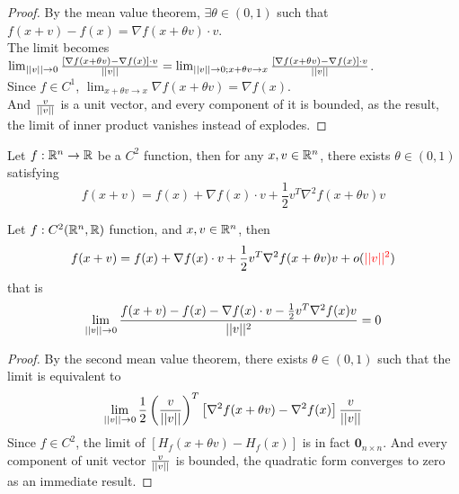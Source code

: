 \documentclass{article}
\begin{document}
    \begin{proof}
    	By the mean value theorem, $\exists \theta \in (0, 1)$ such that $f(x+v) - f(x) = \nabla f(x + \theta v) \cdot v$.\\
    	The limit becomes $\lim_{\vert \vert {v} \vert \vert \to 0} \frac{[\nabla f(x + \theta v) - \nabla f(x)] \cdot v}{\vert \vert {v} \vert \vert} = \lim_{\vert \vert {v} \vert \vert \to 0; x + \theta v \to x} \frac{[\nabla f(x + \theta v) - \nabla f(x)] \cdot v}{\vert \vert {v} \vert \vert}$.\\
    	Since $f \in C^1$, $\lim_{x + \theta v \to x} \nabla f(x + \theta v) = \nabla f(x)$.\\
    	And $\frac{v}{\vert \vert {v} \vert \vert}$ is a unit vector, and every component of it is bounded, as the result, the limit of inner product vanishes instead of explodes.
    \end{proof}
    
    \begin{theorem}
        Let $f: \mathbb{R}^n \to \mathbb{R}$ be a $C^2$ function, then for any $x, v \in \mathbb{R}^n$, there exists $\theta \in (0, 1)$ satisfying
        \begin{equation}
            f(x + v) = f(x) + \nabla f(x) \cdot v + \frac{1}{2} v^T \nabla^2 f(x + \theta v) v
        \end{equation}
    \end{theorem}
    
    \begin{proposition}
        Let $f: C^2(\mathbb{R}^n, \mathbb{R})$ function, and $x, v \in \mathbb{R}^n$, then
        \begin{equation}
            f(x + v) = f(x) + \nabla f(x) \cdot v + \frac{1}{2} v^T \nabla^2 f(x + \theta v) v + o(\textcolor{red}{\vert \vert {v} \vert \vert^2})
        \end{equation}
        that is
        \begin{equation}
            \lim_{\vert \vert {v} \vert \vert \to 0} \frac{
                f(x + v) - f(x) - \nabla f(x) \cdot v - \frac{1}{2} v^T \nabla^2 f(x) v
            }{\vert \vert {v} \vert \vert^2} = 0
        \end{equation}
    \end{proposition}
    
    \begin{proof}
    	By the second mean value theorem, there exists $\theta \in (0, 1)$ such that the limit is equivalent to
    	\begin{align}
    		\lim_{\vert \vert {v} \vert \vert \to 0} \frac{1}{2} \left(\frac{v}{\vert \vert {v} \vert \vert}\right)^T \left[\nabla^2 f(x + \theta v) - \nabla^2 f(x)\right] \frac{v}{\vert \vert {v} \vert \vert}
    	\end{align}
    	Since $f \in C^2$, the limit of $\left[H_f(x + \theta v) - H_f(x)\right]$ is in fact $\textbf{0}_{n \times n}$. And every component of unit vector $\frac{v}{\vert \vert {v} \vert \vert}$ is bounded, the quadratic form converges to zero as an immediate result.
    \end{proof}
    
\end{document}
